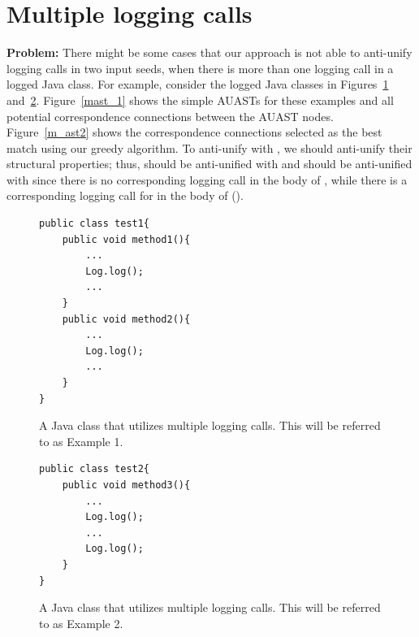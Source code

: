 \section{Multiple logging calls} \label{meth-multipleLogs}
\textbf{Problem:} There might be some cases that our approach is not able to anti-unify logging calls in two input seeds, when there is more than one logging call in a logged Java class. For example, consider the logged Java classes in Figures~\ref{multiple1} and~\ref{multiple2}. Figure~\ref{mast_1} shows the simple AUASTs for these examples and all potential correspondence connections between the AUAST nodes. Figure~\ref{m_ast2} shows the correspondence connections selected as the best match using our greedy algorithm. To anti-unify  with , we should anti-unify their structural properties; thus,  should be anti-unified with  and   should be anti-unified with \nothing since there is no corresponding logging call in the body of , while there is a corresponding logging call for  in the body of  ().


\begin{figure}[H]
\def\baselinestretch{1}
\begin{lstlisting}
public class test1{
	public void method1(){
		...
		Log.log();
		...
	} 
	public void method2(){
		...
		Log.log();
		...
	} 
}
\end{lstlisting}
\caption{A Java class that utilizes multiple logging calls. This will be referred to as Example 1.\label{multiple1}}
\end{figure}



\begin{figure}[H]
\def\baselinestretch{1}
\begin{lstlisting}
public class test2{
	public void method3(){
		...
		Log.log();
		...
		Log.log();
	} 
}
\end{lstlisting}
\caption{A Java class that utilizes multiple logging calls. This will be referred to as Example 2.\label{multiple2}}
\end{figure}

